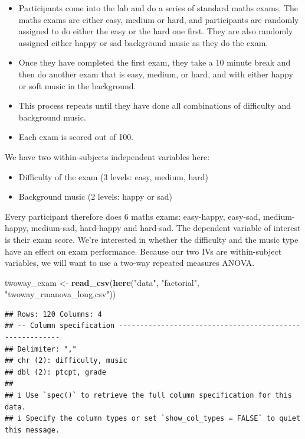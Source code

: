 \documentclass[
]{book}
\newenvironment{Shaded}{\begin{snugshade}}{\end{snugshade}}
\newcommand{\FunctionTok}[1]{\textcolor[rgb]{0.13,0.29,0.53}{\textbf{#1}}}
\newcommand{\NormalTok}[1]{#1}
\newcommand{\OtherTok}[1]{\textcolor[rgb]{0.56,0.35,0.01}{#1}}
\newcommand{\StringTok}[1]{\textcolor[rgb]{0.31,0.60,0.02}{#1}}
\providecommand{\tightlist}{%
  \setlength{\itemsep}{0pt}\setlength{\parskip}{0pt}}
\begin{document}
\begin{itemize}
\tightlist
\item
  Participants come into the lab and do a series of standard maths exams. The maths exams are either easy, medium or hard, and participants are randomly assigned to do either the easy or the hard one first. They are also randomly assigned either happy or sad background music as they do the exam.
\item
  Once they have completed the first exam, they take a 10 minute break and then do another exam that is easy, medium, or hard, and with either happy or soft music in the background.
\item
  This process repeats until they have done all combinations of difficulty and background music.
\item
  Each exam is scored out of 100.
\end{itemize}

We have two within-subjects independent variables here:

\begin{itemize}
\tightlist
\item
  Difficulty of the exam (3 levels: easy, medium, hard)
\item
  Background music (2 levels: happy or sad)
\end{itemize}

Every participant therefore does 6 maths exams: easy-happy, easy-sad, medium-happy, medium-sad, hard-happy and hard-sad. The dependent variable of interest is their exam score. We're interested in whether the difficulty and the music type have an effect on exam performance. Because our two IVs are within-subject variables, we will want to use a two-way repeated measures ANOVA.

\begin{Shaded}
\begin{Highlighting}[]
\NormalTok{twoway\_exam }\OtherTok{\textless{}{-}} \FunctionTok{read\_csv}\NormalTok{(}\FunctionTok{here}\NormalTok{(}\StringTok{"data"}\NormalTok{, }\StringTok{"factorial"}\NormalTok{, }\StringTok{"twoway\_rmanova\_long.csv"}\NormalTok{))}
\end{Highlighting}
\end{Shaded}

\begin{verbatim}
## Rows: 120 Columns: 4
## -- Column specification --------------------------------------------------------
## Delimiter: ","
## chr (2): difficulty, music
## dbl (2): ptcpt, grade
## 
## i Use `spec()` to retrieve the full column specification for this data.
## i Specify the column types or set `show_col_types = FALSE` to quiet this message.
\end{verbatim}
\end{document}
